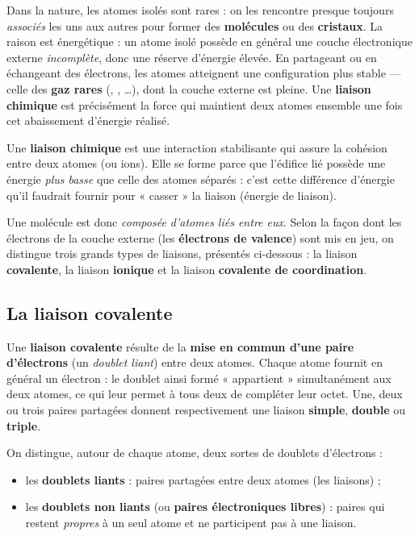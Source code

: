\documentclass[11pt,a4paper]{article}
\begin{document}
Dans la nature, les atomes isolés sont rares : on les rencontre presque toujours
\emph{associés} les uns aux autres pour former des \textbf{molécules} ou des \textbf{cristaux}.
La raison est énergétique : un atome isolé possède en général une couche électronique externe
\emph{incomplète}, donc une réserve d'énergie élevée. En partageant ou en échangeant des
électrons, les atomes atteignent une configuration plus stable — celle des \textbf{gaz rares}
(, , \ldots), dont la couche externe est pleine. Une \textbf{liaison
chimique} est précisément la force qui maintient deux atomes ensemble une fois cet abaissement
d'énergie réalisé.

\begin{definition}
Une \textbf{liaison chimique} est une interaction stabilisante qui assure la cohésion entre deux
atomes (ou ions). Elle se forme parce que l'édifice lié possède une énergie \emph{plus basse}
que celle des atomes séparés : c'est cette différence d'énergie qu'il faudrait fournir pour
« casser » la liaison (énergie de liaison).
\end{definition}

\begin{remarque}
Une molécule est donc \emph{composée d'atomes liés entre eux}. Selon la façon dont les électrons
de la couche externe (les \textbf{électrons de valence}) sont mis en jeu, on distingue trois
grands types de liaisons, présentés ci-dessous : la liaison \textbf{covalente}, la liaison
\textbf{ionique} et la liaison \textbf{covalente de coordination}.
\end{remarque}

\subsection{La liaison covalente}

\begin{definition}
Une \textbf{liaison covalente} résulte de la \textbf{mise en commun d'une paire d'électrons}
(un \emph{doublet liant}) entre deux atomes. Chaque atome fournit en général un électron : le
doublet ainsi formé « appartient » simultanément aux deux atomes, ce qui leur permet à tous deux
de compléter leur octet. Une, deux ou trois paires partagées donnent respectivement une liaison
\textbf{simple}, \textbf{double} ou \textbf{triple}.
\end{definition}

On distingue, autour de chaque atome, deux sortes de doublets d'électrons :
\begin{itemize}[leftmargin=1.6em,topsep=2pt,itemsep=2pt]
  \item les \textbf{doublets liants} : paires partagées entre deux atomes (les liaisons) ;
  \item les \textbf{doublets non liants} (ou \textbf{paires électroniques libres}) : paires qui
        restent \emph{propres} à un seul atome et ne participent pas à une liaison.
\end{itemize}
\end{document}
